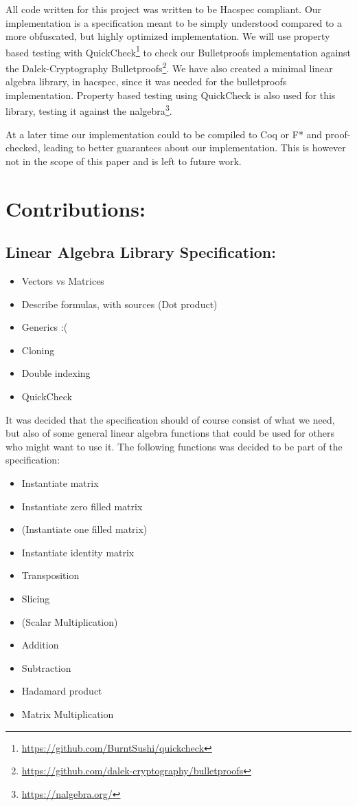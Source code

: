\documentclass{article}
\begin{document}
All code written for this project was written to be Hacspec
compliant.  Our implementation is a specification meant to
be simply understood compared to a more obfuscated, but highly
optimized implementation. We will use property based testing with
QuickCheck\footnote{\url{https://github.com/BurntSushi/quickcheck}}
to check our Bulletproofs implementation against the Dalek-Cryptography
Bulletproofs\footnote{\url{https://github.com/dalek-cryptography/bulletproofs}}.
We have also created a minimal linear algebra library, in hacspec,
since it was needed for the bulletproofs implementation. Property
based testing using QuickCheck is also used for this library, testing
it against the nalgebra\footnote{\url{https://nalgebra.org/}}.

At a later time our implementation could to be compiled to Coq or F* and
proof-checked, leading to better guarantees about our implementation.
This is however not in the scope of this paper and is left to future
work. %

\section{Contributions:}

\subsection{Linear Algebra Library Specification:}
\begin{itemize}
	\item Vectors vs Matrices 
	\item Describe formulas, with sources (Dot product) 
	\item Generics :(
	\item Cloning
	\item Double indexing
	\item QuickCheck
\end{itemize} 

It was decided that the specification should of course consist of what we
need, but also of some general linear algebra functions that could be
used for others who might want to use it. The following functions was
decided to be part of the specification:

\begin{itemize}
	\item Instantiate matrix
	\item Instantiate zero filled matrix
	\item (Instantiate one filled matrix)
	\item Instantiate identity matrix
	\item Transposition
	\item Slicing
	\item (Scalar Multiplication)
	\item Addition
	\item Subtraction
	\item Hadamard product
	\item Matrix Multiplication
\end{itemize}
\end{document}
